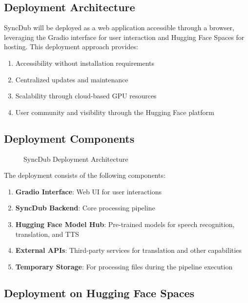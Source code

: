 \documentclass[11pt,a4paper]{article}
\begin{document}
\subsection{Deployment Architecture}

SyncDub will be deployed as a web application accessible through a browser, leveraging the Gradio interface for user interaction and Hugging Face Spaces for hosting. This deployment approach provides:

\begin{enumerate}
    \item Accessibility without installation requirements
    \item Centralized updates and maintenance
    \item Scalability through cloud-based GPU resources
    \item User community and visibility through the Hugging Face platform
\end{enumerate}

\subsection{Deployment Components}

\begin{figure}[h]
\centering
\begin{tikzpicture}[node distance=1.5cm]
\end{tikzpicture}
\caption{SyncDub Deployment Architecture}
\label{fig:architecture}
\end{figure}

The deployment consists of the following components:

\begin{enumerate}
    \item \textbf{Gradio Interface}: Web UI for user interactions
    \item \textbf{SyncDub Backend}: Core processing pipeline
    \item \textbf{Hugging Face Model Hub}: Pre-trained models for speech recognition, translation, and TTS
    \item \textbf{External APIs}: Third-party services for translation and other capabilities
    \item \textbf{Temporary Storage}: For processing files during the pipeline execution
\end{enumerate}

\subsection{Deployment on Hugging Face Spaces}
\end{document}
